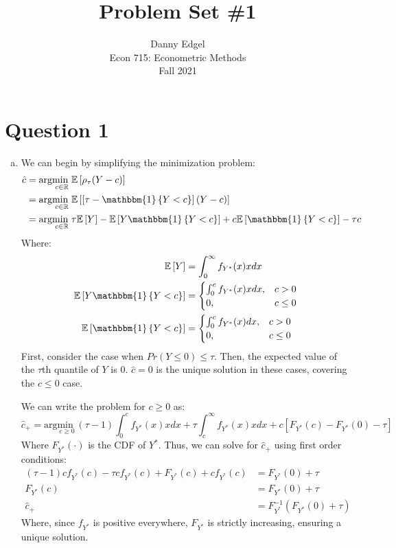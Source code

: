 \documentclass{article}
\newcommand{\R}{\mathbb{R}}
\newcommand{\usmin}[1]{\underset{#1}{\text{min }}}
\newcommand{\one}[1]{\mathbbm{1}\left\{#1\right\}}
\newcommand{\chat}{\hat{c}}
\newcommand{\E}[1]{\mathbb{E}\left[#1\right]}%
\begin{document}
\title{	Problem Set \#1 }
\author{ 	Danny Edgel 					\\ 
			Econ 715: Econometric Methods	\\
			Fall 2021						
		}
\maketitle\thispagestyle{empty}

\section*{Question 1}

\begin{enumerate}[(a)]
    \item We can begin by simplifying the minimization problem:\begin{align*}
        \chat   &= \text{arg}\usmin{c\in\R}\E{\rho_\tau(Y-c)}                                   \\
                &=\text{arg}\usmin{c\in\R}\E{\left[\tau-\one{Y<c}\right](Y-c)}                  \\
                &= \text{arg}\usmin{c\in\R}\tau\E{Y} - \E{Y\one{Y<c}} + c\E{\one{Y<c}} - \tau c 
    \end{align*}
    Where:\begin{align*}
        \E{Y}           &= \int_0^\infty f_{Y^*}(x)xdx  \\
        \E{Y\one{Y<c}}  &= \begin{cases}
            \int_0^c f_{Y^*}(x)xdx,    &c>0        \\
            0,                         &c\leq 0
        \end{cases} \\
        \E{\one{Y<c}}  &= \begin{cases}
            \int_0^c f_{Y^*}(x)dx,    &c>0        \\
            0,                        &c\leq 0
        \end{cases}  
    \end{align*}
    First, consider the case when ${Pr(Y\leq 0)\leq\tau}$. Then, the expected value of the $\tau$th quantile of $Y$ is 0. ${\chat=0}$ is the unique solution in these cases, covering the ${c\leq 0}$ case.
    
    We can write the problem for ${c\geq 0}$ as:{\small \[
        \chat_+ = \text{arg}\usmin{c\geq 0}(\tau-1)\int_0^c f_{Y^*}(x)xdx + \tau\int_c^\infty f_{Y^*}(x)xdx + c\left[F_{Y^*}(c) - F_{Y^*}(0) - \tau\right]
    \] }
    Where ${F_{Y^*}(\cdot)}$ is the CDF of $Y^*$. Thus, we can solve for $\chat_+$ using first order conditions: \begin{align*}
        (\tau-1)cf_{Y^*}(c) - \tau cf_{Y^*}(c) + F_{Y^*}(c) + cf_{Y^*}(c)  &= F_{Y^*}(0) + \tau\\
        F_{Y^*}(c) &= F_{Y^*}(0) + \tau   \\
        \chat_+ &= F_{Y^*}^{-1}\left(F_{Y^*}(0) + \tau\right)
    \end{align*} 
    Where, since $f_{Y^*}$ is positive everywhere, $F_{Y^*}$ is strictly increasing, ensuring a unique solution.


\end{enumerate}
\end{document}
